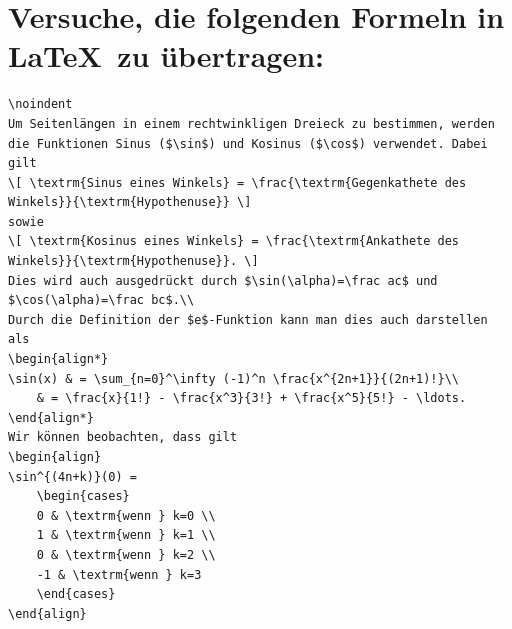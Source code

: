 \section{Versuche, die folgenden Formeln in \LaTeX\, zu übertragen:}

\begin{Antwort}
\begin{lstlisting}[style=latex]
\noindent
Um Seitenlängen in einem rechtwinkligen Dreieck zu bestimmen, werden die Funktionen Sinus ($\sin$) und Kosinus ($\cos$) verwendet. Dabei gilt
\[ \textrm{Sinus eines Winkels} = \frac{\textrm{Gegenkathete des Winkels}}{\textrm{Hypothenuse}} \]
sowie 
\[ \textrm{Kosinus eines Winkels} = \frac{\textrm{Ankathete des Winkels}}{\textrm{Hypothenuse}}. \]
Dies wird auch ausgedrückt durch $\sin(\alpha)=\frac ac$ und $\cos(\alpha)=\frac bc$.\\
Durch die Definition der $e$-Funktion kann man dies auch darstellen als
\begin{align*}
\sin(x) & = \sum_{n=0}^\infty (-1)^n \frac{x^{2n+1}}{(2n+1)!}\\
	& = \frac{x}{1!} - \frac{x^3}{3!} + \frac{x^5}{5!} - \ldots.
\end{align*}
Wir können beobachten, dass gilt
\begin{align}
\sin^{(4n+k)}(0) = 
	\begin{cases}
	0 & \textrm{wenn } k=0 \\
	1 & \textrm{wenn } k=1 \\
	0 & \textrm{wenn } k=2 \\
	-1 & \textrm{wenn } k=3
	\end{cases}	
\end{align}
\end{lstlisting}
\end{Antwort}
\newpage


